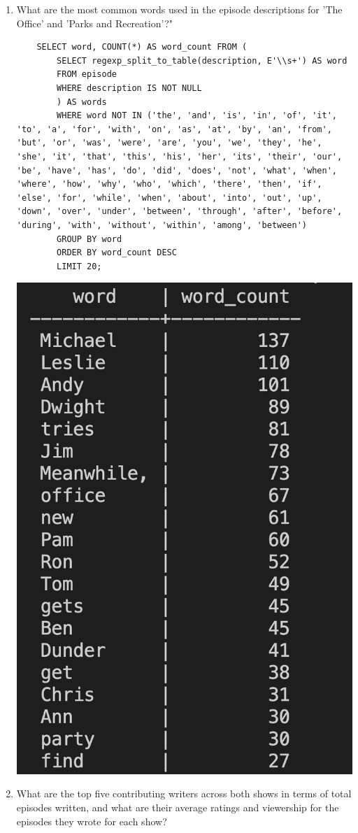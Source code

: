 \documentclass{article}
\begin{document}
\begin{enumerate}
   
    \item What are the most common words used in the episode descriptions for 'The Office' and 'Parks and Recreation'?"
    \begin{verbatim}
    SELECT word, COUNT(*) AS word_count FROM ( 
        SELECT regexp_split_to_table(description, E'\\s+') AS word 
        FROM episode 
        WHERE description IS NOT NULL 
        ) AS words 
        WHERE word NOT IN ('the', 'and', 'is', 'in', 'of', 'it', 'to', 'a', 'for', 'with', 'on', 'as', 'at', 'by', 'an', 'from', 'but', 'or', 'was', 'were', 'are', 'you', 'we', 'they', 'he', 'she', 'it', 'that', 'this', 'his', 'her', 'its', 'their', 'our', 'be', 'have', 'has', 'do', 'did', 'does', 'not', 'what', 'when', 'where', 'how', 'why', 'who', 'which', 'there', 'then', 'if', 'else', 'for', 'while', 'when', 'about', 'into', 'out', 'up', 'down', 'over', 'under', 'between', 'through', 'after', 'before', 'during', 'with', 'without', 'within', 'among', 'between') 
        GROUP BY word 
        ORDER BY word_count DESC 
        LIMIT 20;      
    \end{verbatim}
    \begin{center}     
\includegraphics[width=.3\textwidth]{q1.png}
    \end{center}

\clearpage
    \item What are the top five contributing writers across both shows in terms of total episodes written, and what are their average ratings and viewership for the episodes they wrote for each show?


\end{enumerate}
\end{document}
